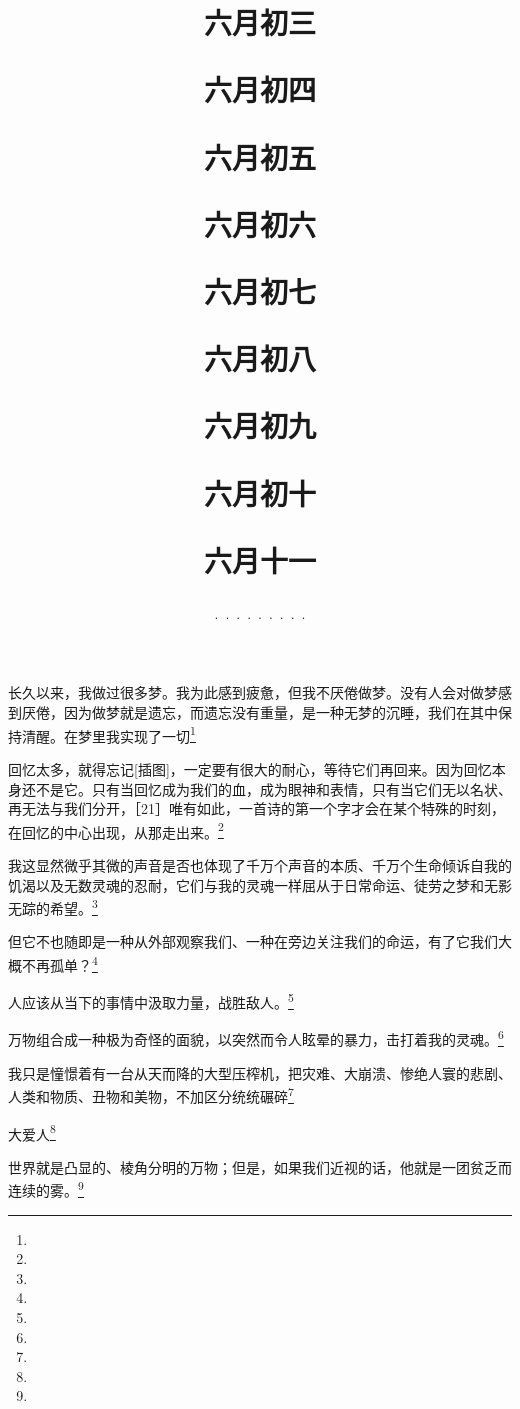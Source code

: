 \title{\date[d=8,m=7,y=2024][year:cn-y,年,month:cn,day:cn,日,·,weekday]·六月初三 }
长久以来，我做过很多梦。我为此感到疲惫，但我不厌倦做梦。没有人会对做梦感到厌倦，因为做梦就是遗忘，而遗忘没有重量，是一种无梦的沉睡，我们在其中保持清醒。在梦里我实现了一切\footnote{ }

\title{\date[d=9,m=7,y=2024][year:cn-y,年,month:cn,day:cn,日,·,weekday]·六月初四 }
回忆太多，就得忘记[插图]，一定要有很大的耐心，等待它们再回来。因为回忆本身还不是它。只有当回忆成为我们的血，成为眼神和表情，只有当它们无以名状、再无法与我们分开，［21］唯有如此，一首诗的第一个字才会在某个特殊的时刻，在回忆的中心出现，从那走出来。\footnote{ }

\title{\date[d=10,m=7,y=2024][year:cn-y,年,month:cn,day:cn,日,·,weekday]·六月初五 }
我这显然微乎其微的声音是否也体现了千万个声音的本质、千万个生命倾诉自我的饥渴以及无数灵魂的忍耐，它们与我的灵魂一样屈从于日常命运、徒劳之梦和无影无踪的希望。\footnote{ }

\title{\date[d=11,m=7,y=2024][year:cn-y,年,month:cn,day:cn,日,·,weekday]·六月初六 }
但它不也随即是一种从外部观察我们、一种在旁边关注我们的命运，有了它我们大概不再孤单？\footnote{ }

\title{\date[d=12,m=7,y=2024][year:cn-y,年,month:cn,day:cn,日,·,weekday]·六月初七 }
人应该从当下的事情中汲取力量，战胜敌人。\footnote{ }

\title{\date[d=13,m=7,y=2024][year:cn-y,年,month:cn,day:cn,日,·,weekday]·六月初八 }
万物组合成一种极为奇怪的面貌，以突然而令人眩晕的暴力，击打着我的灵魂。\footnote{ }

\title{\date[d=14,m=7,y=2024][year:cn-y,年,month:cn,day:cn,日,·,weekday]·六月初九 }
我只是憧憬着有一台从天而降的大型压榨机，把灾难、大崩溃、惨绝人寰的悲剧、人类和物质、丑物和美物，不加区分统统碾碎\footnote{ }

\title{\date[d=15,m=7,y=2024][year:cn-y,年,month:cn,day:cn,日,·,weekday]·六月初十 }
大爱人\footnote{ }

\title{\date[d=16,m=7,y=2024][year:cn-y,年,month:cn,day:cn,日,·,weekday]·六月十一 }
世界就是凸显的、棱角分明的万物；但是，如果我们近视的话，他就是一团贫乏而连续的雾。\footnote{ }

